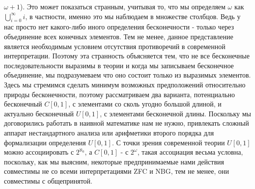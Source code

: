 \documentclass[12pt]{article}
\begin{document}
$\omega + 1$). Это может показаться странным, учитывая то, что мы определяем $\omega$ как $\bigcup\limits^{\infty}_{i = 0} i$, в частности, именно это мы наблюдаем в множестве столбцов. Ведь у нас просто нет какого-либо иного определения бесконечности - только через объединение всех конечных элементов. Тем не менее, данное представление является необходимым условием отсутствия противоречий в современной интерпретации. Поэтому эта странность объясняется тем, что не все бесконечные последовательности выразимы в теории и когда мы записываем бесконечное объединение, мы подразумеваем что оно состоит только из выразимых элементов. Здесь мы стремимся сделать минимум возможных предположений относительно природы бесконечности, поэтому рассматриваем два варианта, потенциально бесконечный $C[0, 1]$, с элементами со сколь угодно большой длиной, и актуально бесконечный $U[0, 1]$, с элементами бесконечной длины. Поскольку мы договорились работать в наивной математике нам не нужно, привлекать сложный аппарат нестандартного анализа или арифметики второго порядка для формализации определения $U[0, 1]$. С точки зрения современной теории $U[0, 1]$ можно ассоциировать с $2^{\aleph_0}$, а $C[0, 1]$ - с $2^{\omega}$, такая ассоциация весьма условна, поскольку, как мы выясним, некоторые предпринимаемые нами действия совместимы не со всеми интерпретациями ZFC и NBG, тем не менее, они совместимы с общепринятой.
\end{document}
